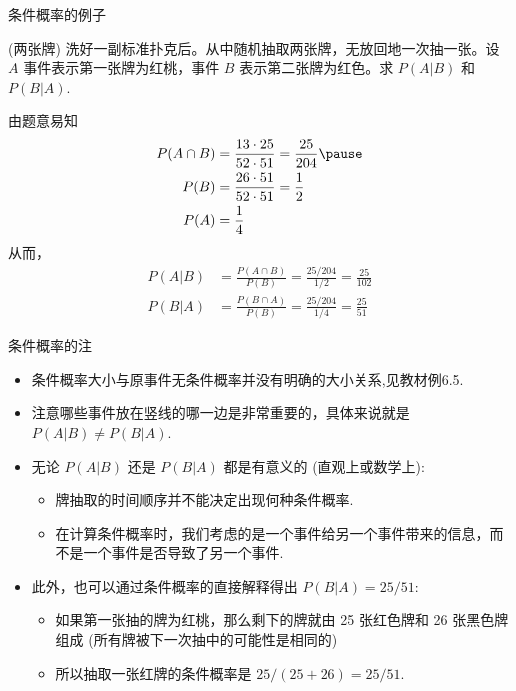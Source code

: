 \begin{frame}{条件概率的例子}
	\begin{exam}
		(两张牌) 洗好一副标准扑克后。从中随机抽取两张牌，无放回地一次抽一张。设 $A$ 事件表示第一张牌为红桃，事件 $B$ 表示第二张牌为红色。求 $P ( A | B )$ 和 $P ( B | A )$.
	\end{exam}

	\begin{jieda}
	  由题意易知
	  \begin{align*}
		P(A\cap B) &=\frac{13 \cdot 25}{52 \cdot 51}=\frac{25}{204}\pause \\
		P(B)&=\frac{26 \cdot 51}{52 \cdot 51}=\frac{1}{2} \\
		P(A) &=\frac{1}{4}
	  \end{align*}
	  \pause
	  从而，
	  \begin{align*}
		P(A|B) &=\frac{P(A\cap B)}{P(B)}=\frac{25/204}{1/2}=\frac{25}{102}\\
		P(B|A) &=\frac{P(B \cap A)}{P(B)}=\frac{25/204}{1/4}=\frac{25}{51}
	  \end{align*}



	\end{jieda}

	\end{frame}
	\begin{frame}{条件概率的注}
	\begin{itemize}[<+-|alert@+>]
	\item 条件概率大小与原事件无条件概率并没有明确的大小关系,见教材例6.5.
	\item  注意哪些事件放在竖线的哪一边是非常重要的，具体来说就是 $P (A|B)\neq P (B|A)$.
	\item 无论 $P (A|B)$ 还是 $P (B|A)$ 都是有意义的 (直观上或数学上):
	\begin{itemize}[<+-|alert@+>]
	   \item 牌抽取的时间顺序并不能决定出现何种条件概率.
	   \item 在计算条件概率时，我们考虑的是一个事件给另一个事件带来的信息，而不是一个事件是否导致了另一个事件.
	\end{itemize}

	\item  此外，也可以通过条件概率的直接解释得出 $P (B|A)=25/51$:
	\begin{itemize}[<+-|alert@+>]
		\item 如果第一张抽的牌为红桃，那么剩下的牌就由 25 张红色牌和 26 张黑色牌组成 (所有牌被下一次抽中的可能性是相同的)
		\item 所以抽取一张红牌的条件概率是 $25/(25+26)=25/51$.
	\end{itemize}
	\end{itemize}

	\end{frame}








